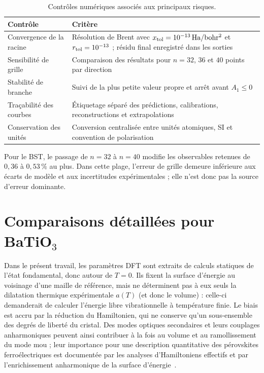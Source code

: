 \begin{table}[H]
\centering
\caption{Contrôles numériques associés aux principaux risques.}
\label{tab:ann_controles}
\begin{tabular}{p{}p{}}
\hline
Contrôle & Critère \\
\hline
Convergence de la racine & Résolution de Brent avec
$x_{\rm tol}=10^{-13}\,\mathrm{Ha/bohr^2}$ et $r_{\rm tol}=10^{-13}$ ; résidu
final enregistré dans les sorties \\
Sensibilité de grille & Comparaison des résultats pour $n=32$, $36$ et $40$ points par direction \\
Stabilité de branche & Suivi de la plus petite valeur propre et arrêt avant $A_1\leq0$ \\
Traçabilité des courbes & Étiquetage séparé des prédictions, calibrations, reconstructions et extrapolations \\
Conservation des unités & Conversion centralisée entre unités atomiques, SI et convention de polarisation \\
\hline
\end{tabular}
\end{table}

Pour le BST, le passage de $n=32$ à $n=40$ modifie les observables retenues de
$0{,}36$ à $0{,}53\,\%$ au plus. Dans cette plage, l'erreur de grille demeure
inférieure aux écarts de modèle et aux incertitudes expérimentales ; elle n'est
donc pas la source d'erreur dominante.

\section{Comparaisons détaillées pour \texorpdfstring{BaTiO$_3$}{BaTiO3}}
\label{ann:bto_detail}

Dans le
présent travail, les paramètres DFT sont extraits de calculs statiques de l'état
fondamental, donc autour de $T=0$. Ils fixent la surface d'énergie au voisinage
d'une maille de référence, mais ne déterminent pas à eux seuls la dilatation
thermique expérimentale $a(T)$ (et donc le volume) : celle-ci demanderait de calculer l'énergie
libre vibrationnelle à température finie. Le biais est accru par la réduction
du Hamiltonien, qui ne conserve qu'un sous-ensemble des degrés de liberté du
cristal. Des modes optiques secondaires et leurs couplages anharmoniques peuvent
ainsi contribuer à la fois au volume et au ramollissement du mode mou ; leur
importance pour une description quantitative des pérovskites ferroélectriques
est documentée par les analyses d'Hamiltoniens effectifs et par l'enrichissement
anharmonique de la surface d'énergie~\cite{Tinte2003,Mayer2022}.

